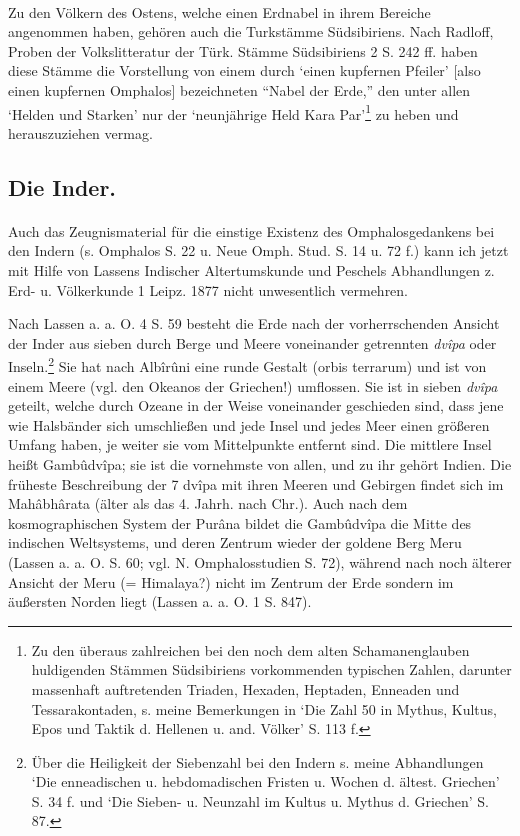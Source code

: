 \documentclass[a4paper, 11pt, oneside]{article}
\begin{document}
\paragraph{}
Zu den Völkern des Ostens, welche einen Erdnabel in ihrem Bereiche angenommen haben, gehören auch die Turkstämme Südsibiriens. Nach Radloff, Proben der Volkslitteratur der Türk. Stämme Südsibiriens 2 S. 242 ff. haben diese Stämme die Vorstellung von einem durch `einen kupfernen Pfeiler' [also einen kupfernen Omphalos] bezeichneten "`Nabel der Erde,"' den unter allen `Helden und Starken' nur der `neunjährige Held Kara Par'\footnote{Zu den überaus zahlreichen bei den noch dem alten Schamanenglauben huldigenden Stämmen Südsibiriens vorkommenden typischen Zahlen, darunter massenhaft auftretenden Triaden, Hexaden, Heptaden, Enneaden und Tessarakontaden, s. meine Bemerkungen in `Die Zahl 50 in Mythus, Kultus, Epos und Taktik d. Hellenen u. and. Völker' S. 113 f.} zu heben und herauszuziehen vermag.

\subsection{Die Inder.}
\paragraph{}
Auch das Zeugnismaterial für die einstige Existenz des Omphalosgedankens bei den Indern (s. Omphalos S. 22 u. Neue Omph. Stud. S. 14 u. 72 f.) kann ich jetzt mit Hilfe von Lassens Indischer Altertumskunde und Peschels Abhandlungen z. Erd- u. Völkerkunde 1 Leipz. 1877 nicht unwesentlich vermehren.

Nach Lassen a. a. O. 4 S. 59 besteht die Erde nach der vorherrschenden Ansicht der Inder aus sieben durch Berge und Meere voneinander getrennten \emph{dvîpa} oder Inseln.\footnote{Über die Heiligkeit der Siebenzahl bei den Indern s. meine Abhandlungen `Die enneadischen u. hebdomadischen Fristen u. Wochen d. ältest. Griechen' S. 34 f. und `Die Sieben- u. Neunzahl im Kultus u. Mythus d. Griechen' S. 87.} Sie hat nach Albîrûni eine runde Gestalt (orbis terrarum) und ist von einem Meere (vgl. den Okeanos der Griechen!) umflossen. Sie ist in sieben \emph{dvîpa} geteilt, welche durch Ozeane in der Weise voneinander geschieden sind, dass jene wie Halsbänder sich umschließen und jede Insel und jedes Meer einen größeren Umfang haben, je weiter sie vom Mittelpunkte entfernt sind. Die mittlere Insel heißt Gambûdvîpa; sie ist die vornehmste von allen, und zu ihr gehört Indien. Die früheste Beschreibung der 7 dvîpa mit ihren Meeren und Gebirgen findet sich im Mahâbhârata (älter als das 4. Jahrh. nach Chr.). Auch nach dem kosmographischen System der Purâna bildet die Gambûdvîpa die Mitte des indischen Weltsystems, und deren Zentrum wieder der goldene Berg Meru (Lassen a. a. O. S. 60; vgl. N. Omphalosstudien S. 72), während nach noch älterer Ansicht der Meru (= Himalaya?) nicht im Zentrum der Erde sondern im äußersten Norden liegt (Lassen a. a. O. 1 S. 847).
\end{document}
